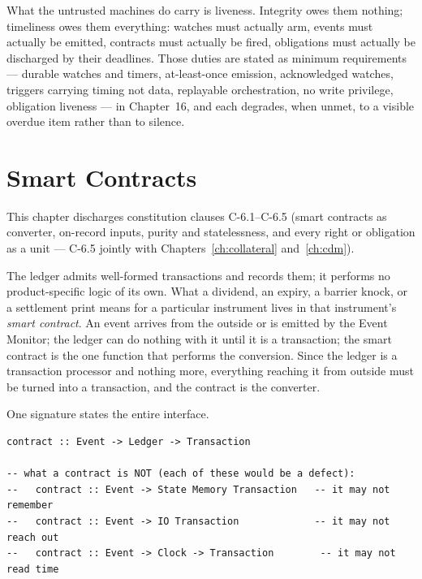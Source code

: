 \documentclass[11pt,a4paper]{article}
\begin{document}
What the untrusted machines do carry is liveness. Integrity owes them nothing;
timeliness owes them everything: watches must actually arm, events must
actually be emitted, contracts must actually be fired, obligations must
actually be discharged by their deadlines. Those duties are stated as minimum
requirements --- durable watches and timers, at-least-once emission,
acknowledged watches, triggers carrying timing not data, replayable
orchestration, no write privilege, obligation liveness --- in Chapter~16, and
each degrades, when unmet, to a visible overdue item rather than to silence.

\section{Smart Contracts}\label{ch:contracts}

This chapter discharges constitution clauses C-6.1--C-6.5 (smart contracts as converter, on-record inputs, purity and statelessness, and every right or obligation as a unit --- C-6.5 jointly with Chapters~\ref{ch:collateral} and~\ref{ch:cdm}).

The ledger admits well-formed transactions and records them; it performs no
product-specific logic of its own. What a dividend, an expiry, a barrier knock,
or a settlement print means for a particular instrument lives in that
instrument's \emph{smart contract}. An event arrives from the outside or is
emitted by the Event Monitor; the ledger can do nothing with it until it is a
transaction; the smart contract is the one function that performs the
conversion. Since the ledger is a transaction processor and nothing more,
everything reaching it from outside must be turned into a transaction, and the
contract is the converter.

One signature states the entire interface.

\begin{lstlisting}
contract :: Event -> Ledger -> Transaction

-- what a contract is NOT (each of these would be a defect):
--   contract :: Event -> State Memory Transaction   -- it may not remember
--   contract :: Event -> IO Transaction             -- it may not reach out
--   contract :: Event -> Clock -> Transaction        -- it may not read time
\end{lstlisting}
\end{document}
